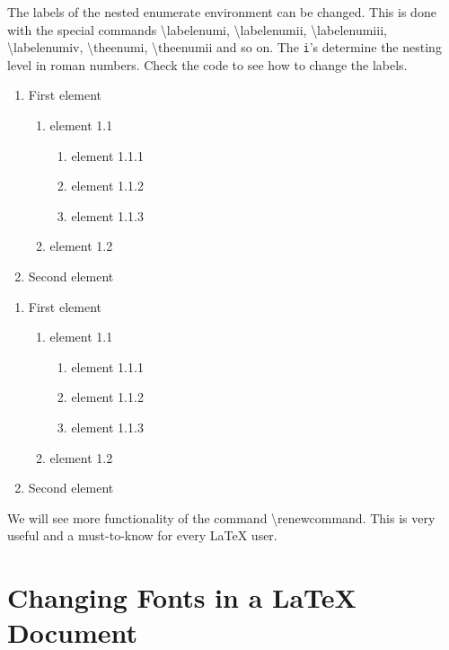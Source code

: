 \documentclass[a4paper]{article}
\newcommand{\bs}[1]{{\color{blue}\textbackslash{}#1}}
\begin{document}
The labels of the nested enumerate environment can be changed. This is done with the special commands 
\bs{labelenumi}, \bs{labelenumii}, \bs{labelenumiii}, \bs{labelenumiv}, \bs{theenumi}, \bs{theenumii} and so on. The \texttt{i}'s determine the nesting level in roman numbers. Check the code to see how to change the labels.

\theenumii 

\theenumiii

\renewcommand\theenumii{}

\theenumii

\begin{enumerate}
  \item First element
    \begin{enumerate}
      \item element 1.1
      \begin{enumerate}
        \item element 1.1.1
        \item element 1.1.2
        \item element 1.1.3
      \end{enumerate}
      \item element 1.2
    \end{enumerate}
  \item Second element
\end{enumerate}


\renewcommand\labelenumii{\theenumii]] ->}

\begin{enumerate}
  \item First element
    \begin{enumerate}
      \item element 1.1
      \begin{enumerate}
        \item element 1.1.1
        \item element 1.1.2
        \item element 1.1.3
      \end{enumerate}
      \item element 1.2
    \end{enumerate}
  \item Second element
\end{enumerate}

We will see more functionality of the command \bs{renewcommand}. This is very useful and a must-to-know for every \LaTeX{} user.

\section{Changing Fonts in a \LaTeX{} Document}
\end{document}
